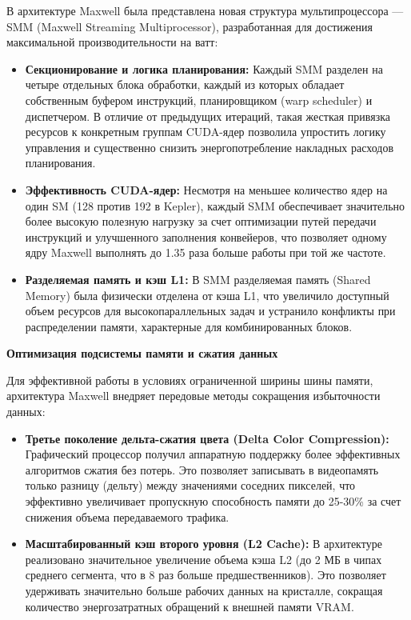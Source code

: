 \documentclass{article}[14pt]
\begin{document}
В архитектуре Maxwell была представлена новая структура мультипроцессора — SMM (Maxwell Streaming Multiprocessor), разработанная для достижения максимальной производительности на ватт:
\begin{itemize}
    \item \textbf{Секционирование и логика планирования:} Каждый SMM разделен на четыре отдельных блока обработки, каждый из которых обладает собственным буфером инструкций, планировщиком (warp scheduler) и диспетчером. В отличие от предыдущих итераций, такая жесткая привязка ресурсов к конкретным группам CUDA-ядер позволила упростить логику управления и существенно снизить энергопотребление накладных расходов планирования.
    \item \textbf{Эффективность CUDA-ядер:} Несмотря на меньшее количество ядер на один SM (128 против 192 в Kepler), каждый SMM обеспечивает значительно более высокую полезную нагрузку за счет оптимизации путей передачи инструкций и улучшенного заполнения конвейеров, что позволяет одному ядру Maxwell выполнять до 1.35 раза больше работы при той же частоте.
    \item \textbf{Разделяемая память и кэш L1:} В SMM разделяемая память (Shared Memory) была физически отделена от кэша L1, что увеличило доступный объем ресурсов для высокопараллельных задач и устранило конфликты при распределении памяти, характерные для комбинированных блоков.
\end{itemize}

\medskip \noindent \textbf{Оптимизация подсистемы памяти и сжатия данных}

Для эффективной работы в условиях ограниченной ширины шины памяти, архитектура Maxwell внедряет передовые методы сокращения избыточности данных:
\begin{itemize}
    \item \textbf{Третье поколение дельта-сжатия цвета (Delta Color Compression):} Графический процессор получил аппаратную поддержку более эффективных алгоритмов сжатия без потерь. Это позволяет записывать в видеопамять только разницу (дельту) между значениями соседних пикселей, что эффективно увеличивает пропускную способность памяти до 25-30\% за счет снижения объема передаваемого трафика.
    \item \textbf{Масштабированный кэш второго уровня (L2 Cache):} В архитектуре реализовано значительное увеличение объема кэша L2 (до 2 МБ в чипах среднего сегмента, что в 8 раз больше предшественников). Это позволяет удерживать значительно больше рабочих данных на кристалле, сокращая количество энергозатратных обращений к внешней памяти VRAM.
\end{itemize}
\end{document}
